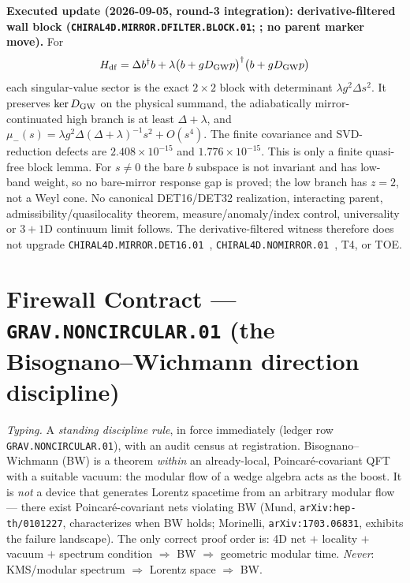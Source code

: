 \documentclass[11pt,a4paper]{article}
\begin{document}
\par\smallskip\noindent\textbf{Executed update (2026-09-05, round-3 integration):
derivative-filtered wall block
(\texttt{CHIRAL4D.MIRROR.DFILTER.BLOCK.01};
; no parent
marker move).}
For
\[
 H_{\rm df}=\Delta b^\dagger b+
 \lambda\bigl(b+gD_{\rm GW}p\bigr)^\dagger
              \bigl(b+gD_{\rm GW}p\bigr)
\]
each singular-value sector is the exact $2{\times}2$ block with determinant
$\lambda g^2\Delta s^2$.  It preserves $\ker D_{\rm GW}$ on the physical summand,
the adiabatically mirror-continuated high branch is at least $\Delta+\lambda$, and
\(
 \mu_-(s)=\lambda g^2\Delta(\Delta+\lambda)^{-1}s^2+O(s^4).
\)
The finite covariance and SVD-reduction defects are
$2.408{\times}10^{-15}$ and $1.776{\times}10^{-15}$.  This is only a finite
quasi-free block lemma.  For $s\ne0$ the bare $b$ subspace is not invariant and has
low-band weight, so no bare-mirror response gap is proved; the low branch has
$z=2$, not a Weyl cone.  No canonical DET16/DET32 realization, interacting parent,
admissibility/quasilocality theorem, measure/anomaly/index control, universality or
$3{+}1$D continuum limit follows.  The derivative-filtered witness therefore does
not upgrade \texttt{CHIRAL4D.MIRROR.DET16.01}~\mC,
\texttt{CHIRAL4D.NOMIRROR.01}~\mO, T4, or TOE.

\section*{Firewall Contract --- \texttt{GRAV.NONCIRCULAR.01} (the Bisognano--Wichmann direction discipline)}
\noindent\emph{Typing.} A \emph{standing discipline rule}, in force immediately (ledger row
\texttt{GRAV.NONCIRCULAR.01}), with an audit census at registration.  Bisognano--Wichmann (BW)
is a theorem \emph{within} an already-local, Poincar\'e-covariant QFT with a suitable vacuum:
the modular flow of a wedge algebra acts as the boost.  It is \emph{not} a device that generates
Lorentz spacetime from an arbitrary modular flow --- there exist Poincar\'e-covariant nets
violating BW (Mund, \texttt{arXiv:hep-th/0101227}, characterizes when BW holds; Morinelli,
\texttt{arXiv:1703.06831}, exhibits the failure landscape).  The only correct proof order is:
4D net $+$ locality $+$ vacuum $+$ spectrum condition $\Rightarrow$ BW $\Rightarrow$ geometric
modular time.  \emph{Never}: KMS/modular spectrum $\Rightarrow$ Lorentz space $\Rightarrow$ BW.
\end{document}

